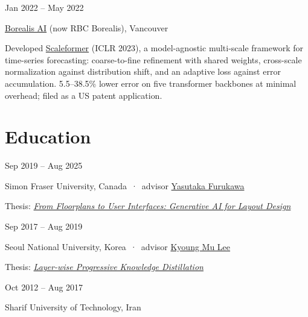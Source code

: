 \documentclass[10pt,letterpaper]{article}
\newcommand{\meta}[1]{{\ttfamily\footnotesize\color{faint}#1}}   %
\newcommand{\dates}[1]{\hfill\meta{#1}}
\newcommand{\soft}[1]{{\color{inksoft}#1}}
\newcommand{\entry}[3]{%
  \par\vspace{4pt}{\bfseries #1}\dates{#3}\par
  \soft{#2}\par\vspace{1pt}}
\begin{document}
\entry{Machine Learning Research Intern}{\href{https://rbcborealis.com/}{Borealis AI} (now RBC Borealis), Vancouver}{Jan 2022 -- May 2022}
\small Developed \href{https://openreview.net/forum?id=sCrnllCtjoE}{Scaleformer} (ICLR 2023), a model-agnostic multi-scale framework for time-series forecasting: coarse-to-fine refinement with shared weights, cross-scale normalization against distribution shift, and an adaptive loss against error accumulation. 5.5--38.5\% lower error on five transformer backbones at minimal overhead; filed as a US patent application.\normalsize

\section{Education}

\entry{Ph.D. in Computing Science}{Simon Fraser University, Canada \,·\, advisor \href{https://yasu-furukawa.github.io/}{Yasutaka Furukawa}}{Sep 2019 -- Aug 2025}
\small Thesis: \href{https://summit.sfu.ca/item/39603}{\emph{From Floorplans to User Interfaces: Generative AI for Layout Design}}\normalsize

\entry{M.Sc. in Electrical and Computer Engineering}{Seoul National University, Korea \,·\, advisor \href{https://cv.snu.ac.kr/}{Kyoung Mu Lee}}{Sep 2017 -- Aug 2019}
\small Thesis: \href{https://s-space.snu.ac.kr/bitstream/10371/161065/1/000000157560.pdf}{\emph{Layer-wise Progressive Knowledge Distillation}}\normalsize

\entry{B.Sc. in Computer Science}{Sharif University of Technology, Iran}{Oct 2012 -- Aug 2017}

\end{document}
